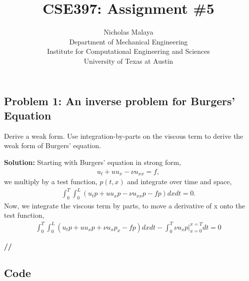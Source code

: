 \documentclass[11pt]{article}
\newenvironment{solution}{\begin{trivlist}\item[]{\bf Solution:}}
                      {\textbf{//} \end{trivlist}}
\begin{document}
\title{\bf{CSE397: Assignment \#5}}
\author{Nicholas Malaya \\ Department of Mechanical Engineering \\
Institute for Computational Engineering and Sciences \\ University of
Texas at Austin} \date{} 
\maketitle
\newpage

\subsection*{Problem 1: An inverse problem for Burgers' Equation}

\begin{enumerate}
\item[(1)] Derive a weak form. Use integration-by-parts on the viscous
	   term to derive the weak form of Burgers' equation. 

\begin{solution}
Starting with Burgers' equation in strong form, 
\begin{align}
 u_t + u u_x - \nu u_{xx} = f, 
\end{align}
we multiply by a test function, $p(t,x)$ and integrate over time and space, 
\begin{align}
 \int_0^T \int_0^L (u_t p + u u_x p - \nu u_{xx} p - f p) dx dt = 0. 
\end{align}
Now, we integrate the viscous term by parts, to move a derivative of x
 onto the test function, 
\begin{align}
 \int_0^T \int_0^L (u_t p + u u_x p + \nu u_{x} p_x - f p) dx dt -
 \int_0^T \nu u_x p \bigg|_{x=0}^{x=T} dt = 0 
\end{align}

 
\end{solution}
\end{enumerate}

\newpage
\subsection*{Code}
%
\end{document}
